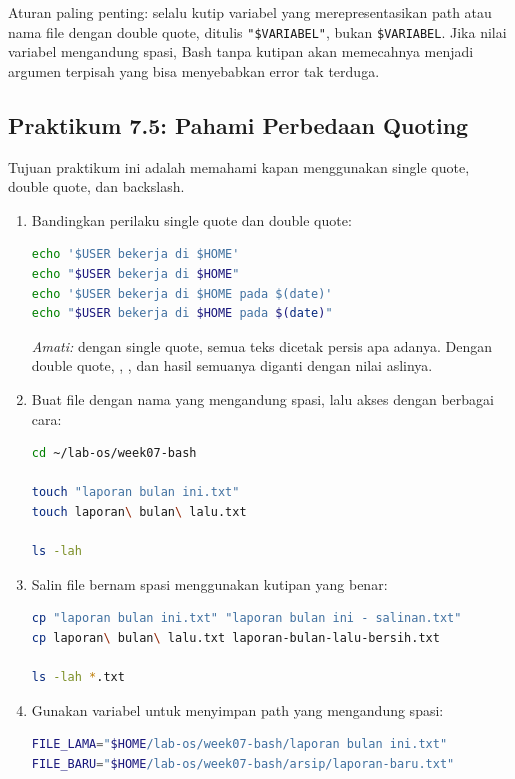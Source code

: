 Aturan paling penting: selalu kutip variabel yang merepresentasikan path
atau nama file dengan double quote, ditulis \texttt{"\$VARIABEL"}, bukan
\texttt{\$VARIABEL}. Jika nilai variabel mengandung spasi, Bash tanpa
kutipan akan memecahnya menjadi argumen terpisah yang bisa menyebabkan
error tak terduga.

\subsection*{Praktikum 7.5: Pahami Perbedaan Quoting}

Tujuan praktikum ini adalah memahami kapan menggunakan single quote,
double quote, dan backslash.

\begin{enumerate}
    \item Bandingkan perilaku single quote dan double quote:
\begin{lstlisting}[language=bash, caption={Perbedaan single quote dan double quote}]
echo '$USER bekerja di $HOME'
echo "$USER bekerja di $HOME"
echo '$USER bekerja di $HOME pada $(date)'
echo "$USER bekerja di $HOME pada $(date)"
\end{lstlisting}
    \textit{Amati:} dengan single quote, semua teks dicetak persis apa
    adanya. Dengan double quote, , , dan hasil
     semuanya diganti dengan nilai aslinya.

    \item Buat file dengan nama yang mengandung spasi, lalu akses dengan
          berbagai cara:
\begin{lstlisting}[language=bash, caption={Menangani nama file dengan spasi}]
cd ~/lab-os/week07-bash

touch "laporan bulan ini.txt"
touch laporan\ bulan\ lalu.txt

ls -lah
\end{lstlisting}

    \item Salin file bernam spasi menggunakan kutipan yang benar:
\begin{lstlisting}[language=bash, caption={Menyalin file dengan nama spasi secara aman}]
cp "laporan bulan ini.txt" "laporan bulan ini - salinan.txt"
cp laporan\ bulan\ lalu.txt laporan-bulan-lalu-bersih.txt

ls -lah *.txt
\end{lstlisting}

    \item Gunakan variabel untuk menyimpan path yang mengandung spasi:
\begin{lstlisting}[language=bash, caption={Variabel untuk path dengan spasi}]
FILE_LAMA="$HOME/lab-os/week07-bash/laporan bulan ini.txt"
FILE_BARU="$HOME/lab-os/week07-bash/arsip/laporan-baru.txt"


\end{lstlisting}
\end{enumerate}
